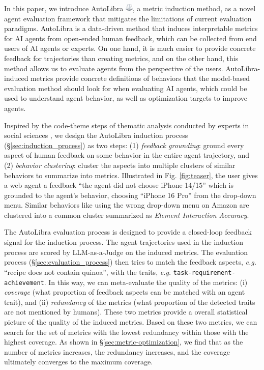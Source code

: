 In this paper, we introduce AutoLibra \protect\includegraphics[height=1em]{figs/scale.png},
a metric induction method, as a novel agent evaluation framework
that mitigates the limitations of current evaluation paradigms.
AutoLibra is a data-driven method that induces interpretable metrics for AI agents
from open-ended human feedback, which can be collected
from end users of AI agents or experts. 
On one hand, it is much easier to provide concrete feedback for trajectories than creating metrics, and on the other hand, this method allows us to evaluate agents from the perspective of the users. 
AutoLibra-induced metrics provide concrete definitions of behaviors that the model-based evaluation method should look for
when evaluating AI agents, which could be used to understand agent behavior,
as well as optimization targets to improve agents.



Inspired by the code-theme steps of thematic analysis conducted by experts
in social sciences \citep{braun2006using},
we design the AutoLibra induction process (\S\ref{sec:induction_process}) as two steps:
(1) \emph{feedback grounding}: ground every aspect of human feedback on some behavior in the entire agent trajectory,
and (2) \emph{behavior clustering}: cluster the aspects into multiple clusters of similar behaviors to summarize into metrics. Illustrated in Fig. \ref{fig:teaser}, the user gives a web agent a feedback ``the agent did not choose iPhone 14/15'' which is grounded to the agent's behavior, choosing ``iPhone 16 Pro'' from the drop-down menu. Similar behaviors like using the wrong drop-down menu on Amazon are clustered into a common cluster summarized as \textit{Element Interaction Accuracy}. 


The AutoLibra evaluation process is designed to provide a closed-loop feedback signal for the induction process. 
The agent trajectories used in the induction process are scored by LLM-as-a-Judge \citep{zheng2023judging}
on the induced metrics. The evaluation process (\S\ref{sec:evaluation_process}) then tries to match the feedback aspects,
\emph{e.g.} ``recipe does not contain quinoa'', with the traits, \emph{e.g.} \texttt{task-requirement-achievement}.
In this way, we can meta-evaluate the quality of the metrics: (i) \emph{coverage} (what proportion of feedback aspects can be matched with an agent trait), and (ii) \emph{redundancy} of the metrics
(what proportion of the detected traits are not mentioned by humans). These two metrics provide a overall statistical picture of the quality of the induced metrics. Based on these two metrics, we can search for the set of metrics with the lowest redundancy within those with the highest coverage. As shown in \S\ref{sec:metric-optimization}, we find that as the number of metrics increases, the redundancy increases, and the coverage ultimately converges to the maximum coverage.



